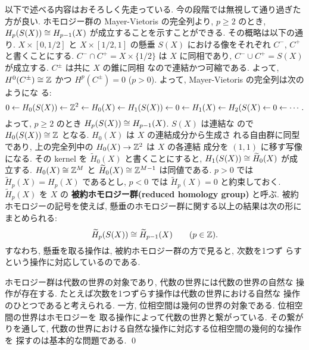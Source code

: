 \documentclass[12pt,twoside]{jarticle}
\begin{document}
\begin{guide}
  以下で述べる内容はおそろしく先走っている.
  今の段階では無視して通り過ぎた方が良い.
  ホモロジー群の Mayer-Vietoris の完全列より, $p\ge 2$ のとき, %
  $H_p(S(X))\cong H_{p-1}(X)$ が成立することを示すことができる. 
  その概略は以下の通り. $X\times[0,1/2]$ と $X\times[1/2,1]$ の懸垂 %
  $S(X)$ における像をそれぞれ $C^{-}$, $C^{+}$ と書くことにする. %
  $C^{-}\cap C^{+}=X\times\{1/2\}$ は $X$ に同相であり, %
  $C^{-}\cup C^{+}=S(X)$ が成立する. $C^{\pm}$ は共に $X$ の錐に同相
  なので連結かつ可縮である. よって, $H^0(C^\pm)\cong{\mathbb Z}$ かつ %
  $H^p(C^\pm)=0$ ($p>0$). よって, Mayer-Vietoris の完全列は次のようにな
  る:
  \begin{equation*}
    0 \leftarrow H_0(S(X)) 
    \leftarrow {\mathbb Z}^2 
    \leftarrow H_0(X) 
    \leftarrow H_1(S(X)) 
    \leftarrow 0 
    \leftarrow H_1(X) 
    \leftarrow H_2(S(X) 
    \leftarrow 0 
    \leftarrow \cdots.
  \end{equation*}
  よって, $p\ge 2$ のとき $H_p(S(X))\cong H_{p-1}(X)$. $S(X)$ は連結な
  ので $H_0(S(X))\cong{\mathbb Z}$ となる. $H_0(X)$ は $X$ の連結成分から生成さ
  れる自由群に同型であり, 上の完全列中の $H_0(X)\to{\mathbb Z}^2$ は $X$ の各連結
  成分を $(1,1)$ に移す写像になる. その kernel を $\widetilde{H}_0(X)$ 
  と書くことにすると, $H_1(S(X))\cong \widetilde{H}_0(X)$ が成立する. %
  $H_0(X)\cong{\mathbb Z}^M$ と $\widetilde{H}_0(X)\cong{\mathbb Z}^{M-1}$ は同値である. %
  $p>0$ では $\widetilde{H}_p(X)=H_p(X)$ であるとし, $p<0$ では %
  $\widetilde{H}_p(X)=0$ と約束しておく. $\widetilde{H}_p(X)$ を $X$ の
  {\bf 被約ホモロジー群(reduced homology group)} と呼ぶ. 
  被約ホモロジーの記号を使えば, 
  懸垂のホモロジー群に関する以上の結果は次の形にまとめられる:
  \[
    \widetilde{H}_p(S(X)) \cong \widetilde{H}_{p-1}(X)
    \qquad
    (p\in{\mathbb Z}).
  \] %
  すなわち, 懸垂を取る操作は, 被約ホモロジー群の方で見ると, 次数を1つず
  らすという操作に対応しているのである.

  ホモロジー群は代数の世界の対象であり, 代数の世界には代数の世界の自然な
  操作が存在する. たとえば次数を1つずらす操作は代数の世界における自然な
  操作のひとつであると考えられる.
  一方, 位相空間は幾何の世界の対象である. 位相空間の世界はホモロジーを
  取る操作によって代数の世界と繋がっている. その繋がりを通して, 
  代数の世界における自然な操作に対応する位相空間の幾何的な操作を
  探すのは基本的な問題である.
  \qed
\end{guide}
\end{document}
